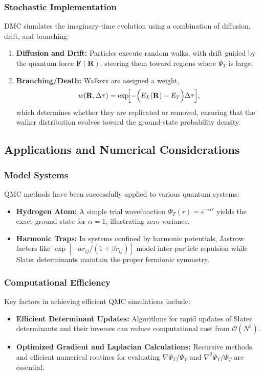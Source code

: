 \subsubsection{Stochastic Implementation}
DMC simulates the imaginary-time evolution using a combination of diffusion, drift, and branching:
\begin{enumerate}
    \item \textbf{Diffusion and Drift:} Particles execute random walks, with drift guided by the quantum force $\mathbf{F}(\mathbf{R})$, steering them toward regions where $\Psi_T$ is large.
    \item \textbf{Branching/Death:} Walkers are assigned a weight,
    \[
    w(\mathbf{R}, \Delta\tau) = \exp\!\Bigl[-\Bigl(E_L(\mathbf{R}) - E_T\Bigr)\Delta\tau\Bigr],
    \]
    which determines whether they are replicated or removed, ensuring that the walker distribution evolves toward the ground-state probability density.
\end{enumerate}

\subsection{Applications and Numerical Considerations}
\subsubsection{Model Systems}
QMC methods have been successfully applied to various quantum systems:
\begin{itemize}
    \item \textbf{Hydrogen Atom:} A simple trial wavefunction $\Psi_T(r)=e^{-\alpha r}$ yields the exact ground state for $\alpha=1$, illustrating zero variance.
    \item \textbf{Harmonic Traps:} In systems confined by harmonic potentials, Jastrow factors like $\exp[-ar_{ij}/(1+\beta r_{ij})]$ model inter-particle repulsion while Slater determinants maintain the proper fermionic symmetry.
\end{itemize}

\subsubsection{Computational Efficiency}
Key factors in achieving efficient QMC simulations include:
\begin{itemize}
    \item \textbf{Efficient Determinant Updates:} Algorithms for rapid updates of Slater determinants and their inverses can reduce computational cost from $\mathcal{O}(N^3)$.
    \item \textbf{Optimized Gradient and Laplacian Calculations:} Recursive methods and efficient numerical routines for evaluating $\nabla\Psi_T/\Psi_T$ and $\nabla^2\Psi_T/\Psi_T$ are essential.
\end{itemize}


